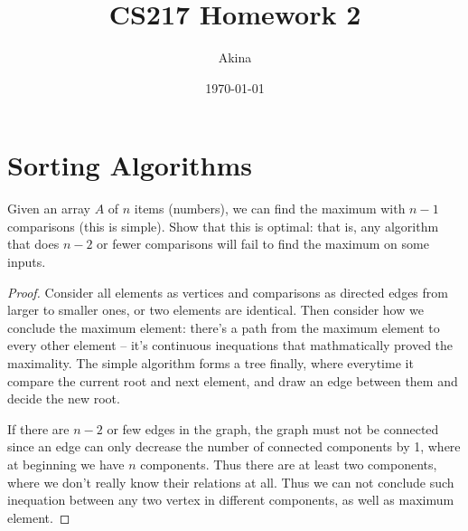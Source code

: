 \documentclass[11pt,a4paper,oneside]{article}
\renewcommand{\hwtitle} {CS217 Homework 2}
\renewcommand{\hwauthor}{Akina}
\renewcommand{\hwdate}{\today}
\begin{document}
\title{\hwtitle}
\author{\hwauthor}
\date{\hwdate}
\maketitle

\section*{Sorting Algorithms}
\begin{problem}{1}
	\statement
	Given an array $A$ of $n$ items (numbers), we can find the maximum with $n-1$ comparisons (this is simple).
	Show that this is optimal: that is, any algorithm that does $n-2$ or fewer comparisons will fail to find the maximum 
	on some inputs.
	\solution
	\begin{proof}
		Consider all elements as vertices and comparisons as directed edges from larger to smaller ones, or two elements are identical. Then consider how we conclude the maximum element: there's a path from the maximum element to every other element -- it's continuous inequations that mathmatically proved the maximality.
		The simple algorithm forms a tree finally, where everytime it compare the current root and next element, and draw an edge between them and decide the new root.

		If there are $n - 2$ or few edges in the graph, the graph must not be connected since an edge can only decrease the number of connected components by 1, where at beginning we have $n$ components. Thus there are at least two components, where we don't really know their relations at all.
		Thus we can not conclude such inequation between any two vertex in different components, as well as maximum element.
	\end{proof}
\end{problem}
\end{document}
